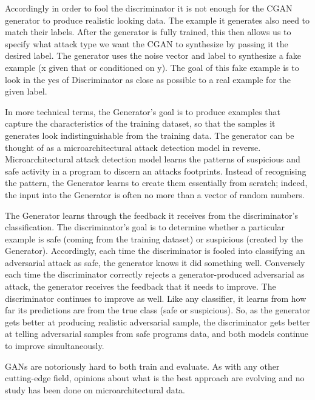  Accordingly in order to fool the discriminator it is not enough for the CGAN generator to produce realistic looking data. The example it generates also need to match their labels. After the generator is fully trained, this then allows us to specify what attack type we want the CGAN to synthesize by passing it the desired label. The generator uses the noise vector and label to synthesize a fake example (x given that or conditioned on y). The goal of this fake example is to look in the yes of Discriminator as close as possible to a real example for the given label.  
 
 
 
 
 
 
 
 
 
 
 
 
 
 
 
 
 In more technical terms, the Generator's goal is to produce examples that capture the characteristics of the training dataset,  so that the samples it generates look indistinguishable from the training data. The generator can be thought of as a microarchitectural attack detection model in reverse. Microarchitectural attack detection model learns the patterns of suspicious and safe activity in a program to discern an attacks footprints. Instead of recognising the pattern, the Generator learns to create them essentially from scratch; indeed, the input into the Generator is often no more than a vector of random numbers. %
 
 
 The Generator learns through the feedback it receives from the discriminator's classification. The discriminator's goal is to determine whether a particular example is safe (coming from the training dataset) or suspicious (created by the Generator). 
Accordingly, each time the discriminator is fooled into classifying an adversarial attack as safe, the generator knows it did something well. Conversely each time the discriminator correctly rejects a generator-produced adversarial as attack, the generator receives the feedback that it needs to improve.
The discriminator continues to improve as well. Like any classifier, it learns from how far its predictions are from the true class (safe or suspicious). So, as the generator gets better at producing realistic adversarial sample, the discriminator gets better at telling adversarial samples from safe programs data, and both models continue to improve simultaneously. 

GANs are notoriously hard to both train and evaluate. As with any other cutting-edge field, opinions about what is the best approach are evolving and no study has been done on microarchitectural data. 


